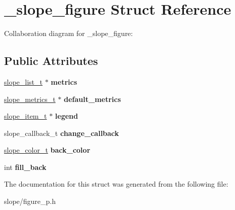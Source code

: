 \hypertarget{struct__slope__figure}{\section{\+\_\+slope\+\_\+figure Struct Reference}
\label{struct__slope__figure}
}


Collaboration diagram for \+\_\+slope\+\_\+figure\+:
\subsection*{Public Attributes}
\begin{DoxyCompactItemize}
\item 
\hypertarget{struct__slope__figure_a783cd1c9b86d7ddc6997a4b7e51b80df}{\hyperlink{struct__slope__list}{slope\+\_\+list\+\_\+t} $\ast$ {\bfseries metrics}}\label{struct__slope__figure_a783cd1c9b86d7ddc6997a4b7e51b80df}

\item 
\hypertarget{struct__slope__figure_a76f248fab4d59b4170709525bca5883c}{\hyperlink{group__Metrics_gab80787ee8ae8dc449e770249fe0e3c35}{slope\+\_\+metrics\+\_\+t} $\ast$ {\bfseries default\+\_\+metrics}}\label{struct__slope__figure_a76f248fab4d59b4170709525bca5883c}

\item 
\hypertarget{struct__slope__figure_ad5e0bd96cade55ef42f5a954322b0ac1}{\hyperlink{group__Item_ga2616141f0e164a876049da51ea3a8646}{slope\+\_\+item\+\_\+t} $\ast$ {\bfseries legend}}\label{struct__slope__figure_ad5e0bd96cade55ef42f5a954322b0ac1}

\item 
\hypertarget{struct__slope__figure_ab4d6de431e6f0b4a97b780b606ae0da3}{slope\+\_\+callback\+\_\+t {\bfseries change\+\_\+callback}}\label{struct__slope__figure_ab4d6de431e6f0b4a97b780b606ae0da3}

\item 
\hypertarget{struct__slope__figure_afce997af5c45b99ba7f123d40b5d0975}{\hyperlink{struct__slope__color}{slope\+\_\+color\+\_\+t} {\bfseries back\+\_\+color}}\label{struct__slope__figure_afce997af5c45b99ba7f123d40b5d0975}

\item 
\hypertarget{struct__slope__figure_ac29b1eb35fd245cf8603548bf360f415}{int {\bfseries fill\+\_\+back}}\label{struct__slope__figure_ac29b1eb35fd245cf8603548bf360f415}

\end{DoxyCompactItemize}


The documentation for this struct was generated from the following file\+:\begin{DoxyCompactItemize}
\item 
slope/figure\+\_\+p.\+h\end{DoxyCompactItemize}
